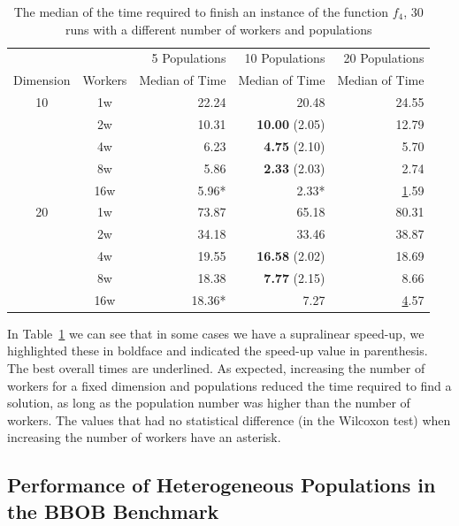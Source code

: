\documentclass[review]{elsarticle}
\begin{document}
\begin{table}[tbp]
  \caption{The median of the time required to finish an instance of the function $f_4$, 30 runs
  with a different number of workers and populations}
  \label{tab:time}
  \vspace{0.25cm}
    \centering
    \begin{tabular}{ccrrr}
    \hline
              &         & 5 Populations    & 10 Populations & 20 Populations \\
     Dimension& Workers & Median of Time   & Median of Time & Median of Time  \\
    \hline
          10  & 1w      & 22.24  & 20.48           & 24.55  \\
              & 2w      & 10.31  & \textbf{10.00} (2.05)    & 12.79 \\
              & 4w      &  6.23  & \textbf{4.75} (2.10)     &  5.70 \\
              & 8w      &  5.86  &  \textbf{2.33} (2.03)           & 2.74 \\
              & 16w     &  5.96*  &  2.33*           & {\ul 1.59} \\
    
    \hline
          20  & 1w   & 73.87   & 65.18                 & 80.31 \\
              & 2w   & 34.18   & 33.46                 & 38.87 \\
              & 4w   & 19.55   & \textbf{16.58} (2.02) & 18.69 \\
              & 8w   & 18.38   & \textbf{7.77} (2.15)  & 8.66 \\
              & 16w  & 18.36*  & 7.27                  & {\ul 4.57} \\
    \hline
  \end{tabular}
\end{table}

In Table~\ref{tab:time} we can see that in some cases we have a supralinear
speed-up, we highlighted these in boldface and indicated the speed-up value in
parenthesis. The best overall times are underlined. As expected, increasing the
number of workers for a fixed dimension and populations reduced the time
required to find a solution, as long as the population number was higher than
the number of workers. The values that had no statistical difference (in the
Wilcoxon test) when increasing the number of workers have an asterisk.



\subsection{Performance of Heterogeneous Populations in the BBOB Benchmark}
\label{sec:exp2}
\end{document}
